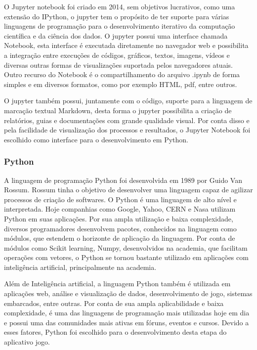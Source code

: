         O Jupyter notebook foi criado em 2014, sem objetivos lucrativos, como uma extensão do IPython, o jupyter tem o propósito de ter suporte para várias linguagens de programação para o desenvolvimento iterativo da computação científica e da ciência dos dados. O jupyter possui uma interface chamada Notebook, esta interface é executada diretamente no navegador web e possibilita a integração entre  execuções de códigos, gráficos, textos, imagens, vídeos e diversas outras formas de visualizações suportada pelos navegadores atuais. Outro recurso do Notebook é o compartilhamento do arquivo .ipynb de forma simples e em diversos formatos, como por exemplo HTML, pdf, entre outros.	

    	O jupyter também possui, juntamente com o código, suporte para a linguagem de marcação textual Markdown, desta forma o jupyter possibilita a criação de relatórios, guias e documentações com grande qualidade visual.  Por conta disso e pela facilidade de visualização dos processos e resultados, o Jupyter Notebook foi escolhido como interface para o desenvolvimento em Python. 	

    \subsubsection{Python}	
    
        A linguagem de programação Python foi desenvolvida em 1989 por Guido Van Rossum. Rossum tinha o objetivo de desenvolver uma linguagem capaz de agilizar processos de criação de softwares. 	
    	O Python é uma linguagem de alto nível e interpretada. Hoje companhias como Google, Yahoo, CERN e Nasa utilizam Python em suas aplicações. Por sua ampla utilização e baixa complexidade, diversos programadores desenvolvem pacotes, conhecidos na linguagem como módulos, que estendem o horizonte de aplicação da linguagem. Por conta de módulos como Scikit learning, Numpy, desenvolvidos na academia, que facilitam operações com vetores, o Python se tornou bastante utilizado em aplicações com inteligência artificial,  principalmente na academia.	

        Além de Inteligência artificial, a linguagem Python também é utilizada em aplicações web, análise e visualização de dados, desenvolvimento de jogo, sistemas embarcados, entre outras. Por conta de sua ampla aplicabilidade e baixa complexidade,  é uma das linguagens de programação mais utilizadas hoje em dia e possui uma das comunidades mais ativas em fóruns, eventos e cursos. Devido a esses fatores, Python foi escolhido para o desenvolvimento desta etapa do aplicativo jogo.  	

